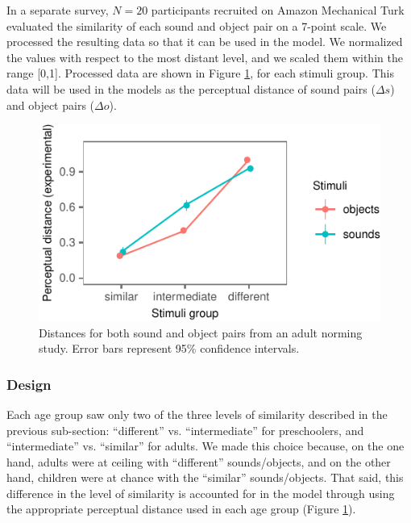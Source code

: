 \documentclass[10pt, letterpaper]{article}
\newenvironment{CodeChunk}{}{}
\begin{document}
In a separate survey, \(N=20\) participants recruited on Amazon
Mechanical Turk evaluated the similarity of each sound and object pair
on a 7-point scale. We processed the resulting data so that it can be
used in the model. We normalized the values with respect to the most
distant level, and we scaled them within the range {[}0,1{]}. Processed
data are shown in Figure \ref{fig:stim}, for each stimuli group. This
data will be used in the models as the perceptual distance of sound
pairs (\(\Delta s\)) and object pairs (\(\Delta o\)).

\begin{CodeChunk}
\begin{figure}[h]

{\centering \includegraphics{figs/stim-1} 

}

\caption{\label{fig:stim}Distances for both sound and object pairs from an adult norming study. Error bars represent 95\% confidence intervals.}\label{fig:stim}
\end{figure}
\end{CodeChunk}

\subsubsection{Design}\label{design}

Each age group saw only two of the three levels of similarity described
in the previous sub-section: ``different'' vs. ``intermediate'' for
preschoolers, and ``intermediate'' vs. ``similar'' for adults. We made
this choice because, on the one hand, adults were at ceiling with
``different'' sounds/objects, and on the other hand, children were at
chance with the ``similar'' sounds/objects. That said, this difference
in the level of similarity is accounted for in the model through using
the appropriate perceptual distance used in each age group (Figure
\ref{fig:stim}).
\end{document}
